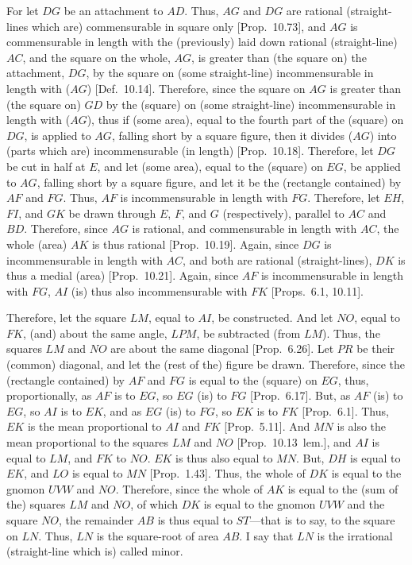 \begin{Parallel}{}{}
{For let $DG$ be an attachment to $AD$. Thus, $AG$ and $DG$ are rational (straight-lines which are) commensurable in square only [Prop.~10.73], and $AG$ is commensurable
in length with the (previously) laid down rational (straight-line) $AC$, and
the square on the whole, $AG$, is greater than (the square on) the attachment,
$DG$, by the square on (some straight-line) incommensurable
in length with ($AG$) [Def.~10.14]. Therefore,
since the square on $AG$ is greater than (the square on)  $GD$ by the
(square) on (some straight-line) incommensurable in length with ($AG$),
thus if (some area), equal to the fourth part of the (square) on $DG$,
is applied to $AG$, falling short by a square figure, then it divides
($AG$) into (parts which are) incommensurable (in length) 
[Prop.~10.18]. Therefore, let $DG$ be
cut in half at $E$, and let (some area), equal to the (square) on
$EG$, be applied to $AG$, falling short by a square figure, and
let it be the (rectangle contained) by $AF$ and $FG$. Thus, $AF$
is incommensurable in length with $FG$. Therefore, let $EH$, $FI$, and $GK$
be drawn through $E$, $F$, and $G$ (respectively), parallel
to $AC$ and $BD$. Therefore, since $AG$ is rational, and
commensurable in length with $AC$, the whole (area) $AK$
is thus rational [Prop.~10.19]. Again, since $DG$ is incommensurable in length with
$AC$, and both are rational (straight-lines), $DK$ is thus
a medial (area) [Prop.~10.21]. Again, since
$AF$ is incommensurable in length with $FG$, $AI$ (is) thus also
incommensurable with $FK$ [Props.~6.1, 10.11].

\epsfysize=1.3in
\centerline{}

Therefore, let the square $LM$, equal  to $AI$, be constructed. And let $NO$, equal to $FK$, (and) about the same angle, $LPM$,  be subtracted (from $LM$). Thus, the squares $LM$ and $NO$ are about the
same diagonal [Prop.~6.26]. Let $PR$ be their (common) diagonal, and let the (rest of the) figure be drawn. Therefore, since
the (rectangle contained) by $AF$ and $FG$ is equal to the (square) on $EG$, thus, proportionally, as $AF$ is to $EG$, so $EG$ (is) to $FG$
[Prop.~6.17]. 
But, as $AF$ (is) to $EG$, so
$AI$ is to $EK$, and as $EG$ (is) to $FG$, so $EK$ is to $FK$ [Prop.~6.1]. Thus, $EK$ is the mean proportional to
$AI$ and $FK$ [Prop.~5.11]. And $MN$ is also the mean proportional to the squares $LM$
and $NO$ [Prop.~10.13~lem.], and $AI$ is equal to $LM$, and $FK$ to $NO$. $EK$ is thus also equal to $MN$. But, $DH$ is equal to $EK$, and $LO$ is equal to $MN$ [Prop.~1.43]. 
Thus, the whole of $DK$ is equal to the gnomon $UVW$ and $NO$.
Therefore, since the whole of $AK$ is equal to the (sum of the) squares $LM$ and
$NO$, of which $DK$ is equal to the gnomon $UVW$ and the square
$NO$, the remainder $AB$ is thus equal to $ST$---that is to say, to the
square on $LN$. Thus, $LN$ is the square-root of area $AB$. I say
that $LN$ is the irrational (straight-line which is) called minor.

}
\end{Parallel}
